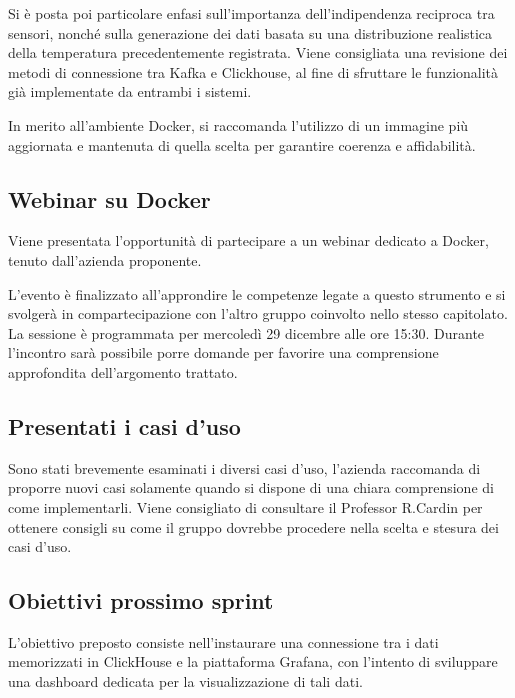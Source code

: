 \documentclass{article}
\begin{document}
Si è posta poi particolare enfasi sull'importanza dell'indipendenza reciproca tra sensori, nonché sulla generazione dei dati basata su una distribuzione realistica della temperatura precedentemente registrata.
Viene consigliata una revisione dei metodi di connessione tra Kafka e Clickhouse, al fine di sfruttare le funzionalità già implementate da entrambi i sistemi.

In merito all'ambiente Docker, si raccomanda l'utilizzo di un immagine più aggiornata e mantenuta di quella scelta per garantire coerenza e affidabilità.

\subsection{Webinar su Docker}
Viene presentata l'opportunità di partecipare a un webinar dedicato a Docker, tenuto dall'azienda proponente.

L'evento è finalizzato all'approndire le competenze legate a questo strumento e si svolgerà in compartecipazione con l'altro gruppo coinvolto nello stesso capitolato. La sessione è programmata per mercoledì 29 dicembre alle ore 15:30. Durante l'incontro sarà possibile porre domande per favorire una comprensione approfondita dell'argomento trattato.

\subsection{Presentati i casi d'uso}
Sono stati brevemente esaminati i diversi casi d'uso, l'azienda raccomanda di proporre nuovi casi solamente quando si dispone di una chiara comprensione di come implementarli.
Viene consigliato di consultare il Professor R.Cardin per ottenere consigli su come il gruppo dovrebbe procedere nella scelta e stesura dei casi d'uso.

\subsection{Obiettivi prossimo sprint}
L'obiettivo preposto consiste nell'instaurare una connessione tra i dati memorizzati in ClickHouse e la piattaforma Grafana, con l'intento di sviluppare una dashboard dedicata per la visualizzazione di tali dati.
\end{document}
